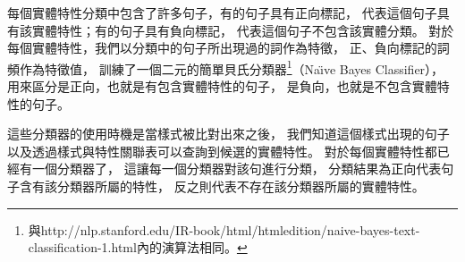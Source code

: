 每個實體特性分類中包含了許多句子，有的句子具有正向標記，
代表這個句子具有該實體特性；有的句子具有負向標記，
代表這個句子不包含該實體分類。
對於每個實體特性，我們以分類中的句子所出現過的詞作為特徵，
正、負向標記的詞頻作為特徵值，
訓練了一個二元的簡單貝氏分類器\footnote{與http://nlp.stanford.edu/IR-book/html/htmledition/naive-bayes-text-classification-1.html內的演算法相同。}（Na\"{\i}ve Bayes Classifier），
用來區分是正向，也就是有包含實體特性的句子，
是負向，也就是不包含實體特性的句子。

這些分類器的使用時機是當樣式被比對出來之後，
我們知道這個樣式出現的句子以及透過樣式與特性關聯表可以查詢到候選的實體特性。
對於每個實體特性都已經有一個分類器了，
這讓每一個分類器對該句進行分類，
分類結果為正向代表句子含有該分類器所屬的特性，
反之則代表不存在該分類器所屬的實體特性。

